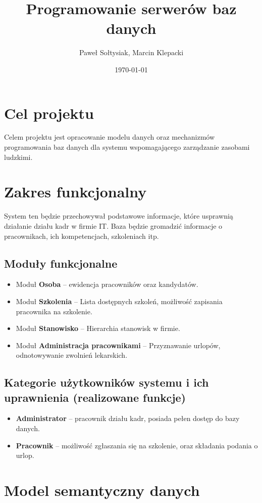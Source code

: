 \documentclass[a4paper]{article}
\title{Programowanie serwerów baz danych}
\author{Paweł Sołtysiak, Marcin Klepacki}
\date{\today}
\begin{document}

\tableofcontents
\section{Cel projektu}
Celem projektu jest opracowanie modelu danych oraz mechanizmów programowania baz danych dla systemu wspomagającego zarządzanie zasobami ludzkimi.

\section{Zakres funkcjonalny}
System ten będzie przechowywał podstawowe informacje, które usprawnią działanie działu kadr w firmie IT. Baza będzie gromadzić informacje o pracownikach, ich kompetencjach, szkoleniach itp.
\subsection{Moduły funkcjonalne}
\begin{itemize}
\item Moduł \textbf{Osoba} -- ewidencja pracowników oraz kandydatów.
\item Moduł \textbf{Szkolenia} -- Lista dostępnych szkoleń, możliwość zapisania pracownika na szkolenie.
\item Moduł \textbf{Stanowisko} -- Hierarchia stanowisk w firmie.
\item Moduł \textbf{Administracja pracownikami} -- Przyznawanie urlopów, odnotowywanie zwolnień lekarskich.
\end{itemize}
\subsection{Kategorie użytkowników systemu i ich uprawnienia (realizowane funkcje)}
\begin{itemize}
\item \textbf{Administrator} -- pracownik działu kadr, posiada pełen dostęp do bazy danych.
\item \textbf{Pracownik} -- możliwość zgłaszania się na szkolenie, oraz składania podania o urlop.

\end{itemize}
\section{Model semantyczny danych}
\end{document}
